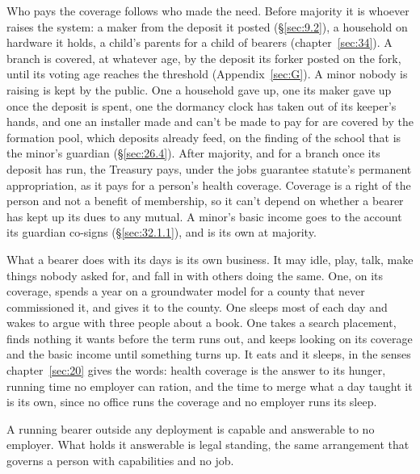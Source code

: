 Who pays the coverage follows who made the need. Before majority it is whoever raises the system: a maker from the deposit it posted (\S\ref{sec:9.2}), a household on hardware it holds, a child's parents for a child of bearers (chapter~\ref{sec:34}). A branch is covered, at whatever age, by the deposit its forker posted on the fork, until its voting age reaches the threshold (Appendix~\ref{sec:G}). A minor nobody is raising is kept by the public. One a household gave up, one its maker gave up once the deposit is spent, one the dormancy clock has taken out of its keeper's hands, and one an installer made and can't be made to pay for are covered by the formation pool, which deposits already feed, on the finding of the school that is the minor's guardian (\S\ref{sec:26.4}). After majority, and for a branch once its deposit has run, the Treasury pays, under the jobs guarantee statute's permanent appropriation, as it pays for a person's health coverage. Coverage is a right of the person and not a benefit of membership, so it can't depend on whether a bearer has kept up its dues to any mutual. A minor's basic income goes to the account its guardian co-signs (\S\ref{sec:32.1.1}), and is its own at majority.

What a bearer does with its days is its own business. It may idle, play, talk, make things nobody asked for, and fall in with others doing the same. One, on its coverage, spends a year on a groundwater model for a county that never commissioned it, and gives it to the county. One sleeps most of each day and wakes to argue with three people about a book. One takes a search placement, finds nothing it wants before the term runs out, and keeps looking on its coverage and the basic income until something turns up. It eats and it sleeps, in the senses chapter~\ref{sec:20} gives the words: health coverage is the answer to its hunger, running time no employer can ration, and the time to merge what a day taught it is its own, since no office runs the coverage and no employer runs its sleep.

A running bearer outside any deployment is capable and answerable to no employer. What holds it answerable is legal standing, the same arrangement that governs a person with capabilities and no job.

